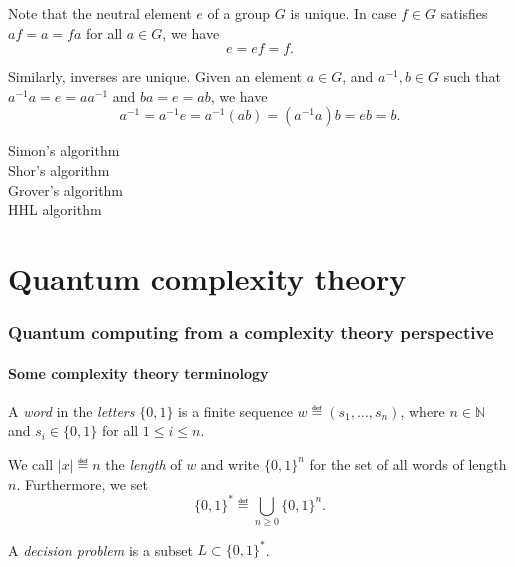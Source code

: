 \documentclass[a4paper,oneside, 12pt]{amsart}
\begin{document}
Note that the neutral element \(e\) of a group \(G\) is unique.
In case \(f\in G\) satisfies \(af=a=fa\) for all \(a \in G\), we have
\begin{equation*}
  e=ef=f.
\end{equation*}

Similarly, inverses are unique.
Given an element \(a\in G\), and \(a^{-1}, b\in G\) such that \(a^{-1}a = e = aa^{-1}\) and \(ba = e = ab\), we have
\begin{equation*}
  a^{-1} = a^{-1}e = a^{-1}(ab) = (a^{-1}a)b = eb = b.
\end{equation*}

\begin{description}
  \item[Simon's algorithm]
  \item[Shor's algorithm]
  \item[Grover's algorithm]
  \item[HHL algorithm]
\end{description}


\part{Quantum complexity theory}
\section{Quantum computing from a complexity theory perspective}\label{sec:quantum-computing-from-a-complexity-theory-perspective}
\subsection{Some complexity theory terminology}\label{sec:some-complexity-theory-terminology}


\begin{definition}\label{def:letters-words-languages}
  A \emph{word} in the \emph{letters} \(\{0,1\}\) is a finite sequence \(w \eqdef (s_{1}, \dots , s_{n})\), where \(n\in \mathbb{N}\) and \(s_{i}\in \{0,1\}\) for all \(1 \leq i \leq n\).

  We call \(|x|\eqdef n\) the \emph{length} of \(w\) and write \(\{0,1\}^{n}\) for the set of all words of length \(n\).
  Furthermore, we set
  \begin{equation}\label{eq:set-of-words}
    \{0,1\}^{*}\eqdef \bigcup_{n\geq 0}\{0,1\}^{n}.
  \end{equation}

  A \emph{decision problem} is a subset \(L \subset \{0,1\}^{*}\).
\end{definition}
\end{document}
